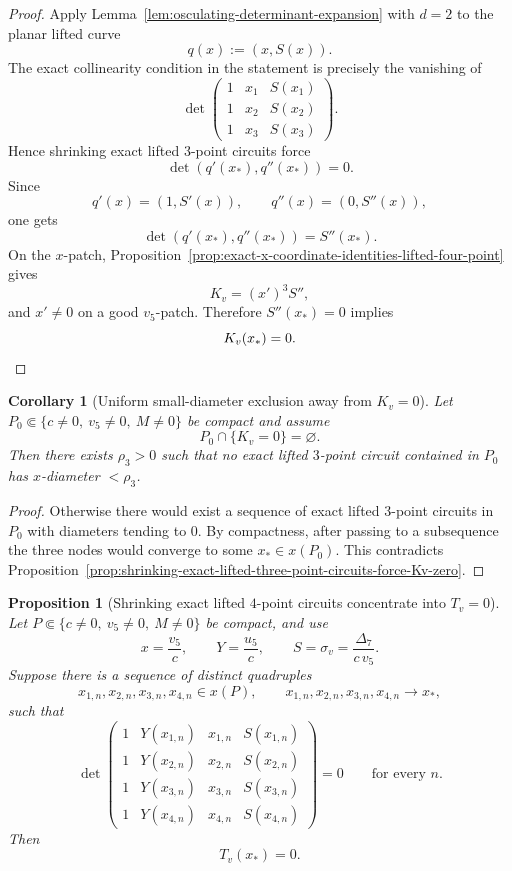 \documentclass[11pt,a4paper]{amsart}
\theoremstyle{plain}
\newtheorem{proposition}[theorem]{Proposition}
\newtheorem{corollary}[theorem]{Corollary}
\theoremstyle{definition}
\begin{document}
\begin{proof}
Apply Lemma~\ref{lem:osculating-determinant-expansion} with $d=2$ to the
planar lifted curve
\[
q(x):=(x,S(x)).
\]
The exact collinearity condition in the statement is precisely the vanishing of
\[
\det\!\begin{pmatrix}
1&x_1&S(x_1)\\
1&x_2&S(x_2)\\
1&x_3&S(x_3)
\end{pmatrix}.
\]
Hence shrinking exact lifted $3$-point circuits force
\[
\det(q'(x_*),q''(x_*))=0.
\]
Since
\[
q'(x)=(1,S'(x)),
\qquad
q''(x)=(0,S''(x)),
\]
one gets
\[
\det(q'(x_*),q''(x_*))=S''(x_*).
\]
On the $x$-patch, Proposition~\ref{prop:exact-x-coordinate-identities-lifted-four-point}
gives
\[
K_v=(x')^3S'',
\]
and $x'\neq 0$ on a good $v_5$-patch. Therefore $S''(x_*)=0$ implies
\[
K_v(x_*)=0.
\qedhere
\]
\end{proof}

\begin{corollary}[Uniform small-diameter exclusion away from $K_v=0$]
\label{cor:uniform-small-diameter-exclusion-away-from-Kv-zero}
Let $P_0\Subset\{c\neq 0,\ v_5\neq 0,\ M\neq 0\}$ be compact and assume
\[
P_0\cap\{K_v=0\}=\varnothing.
\]
Then there exists $\rho_3>0$ such that no exact lifted $3$-point circuit
contained in $P_0$ has $x$-diameter $<\rho_3$.
\end{corollary}

\begin{proof}
Otherwise there would exist a sequence of exact lifted $3$-point circuits in
$P_0$ with diameters tending to $0$. By compactness, after passing to a
subsequence the three nodes would converge to some $x_*\in x(P_0)$. This
contradicts
Proposition~\ref{prop:shrinking-exact-lifted-three-point-circuits-force-Kv-zero}.
\end{proof}

\begin{proposition}[Shrinking exact lifted $4$-point circuits concentrate into $T_v=0$]
\label{prop:shrinking-exact-lifted-four-point-circuits-force-Tv-zero}
Let $P\Subset\{c\neq 0,\ v_5\neq 0,\ M\neq 0\}$ be compact, and use
\[
x=\frac{v_5}{c},
\qquad
Y=\frac{u_5}{c},
\qquad
S=\sigma_v=\frac{\Delta_7}{c\,v_5}.
\]
Suppose there is a sequence of distinct quadruples
\[
x_{1,n},x_{2,n},x_{3,n},x_{4,n}\in x(P),
\qquad
x_{1,n},x_{2,n},x_{3,n},x_{4,n}\to x_*,
\]
such that
\[
\det\!\begin{pmatrix}
1&Y(x_{1,n})&x_{1,n}&S(x_{1,n})\\
1&Y(x_{2,n})&x_{2,n}&S(x_{2,n})\\
1&Y(x_{3,n})&x_{3,n}&S(x_{3,n})\\
1&Y(x_{4,n})&x_{4,n}&S(x_{4,n})
\end{pmatrix}
=0
\qquad
\text{for every }n.
\]
Then
\[
T_v(x_*)=0.
\]
\end{proposition}
\end{document}
